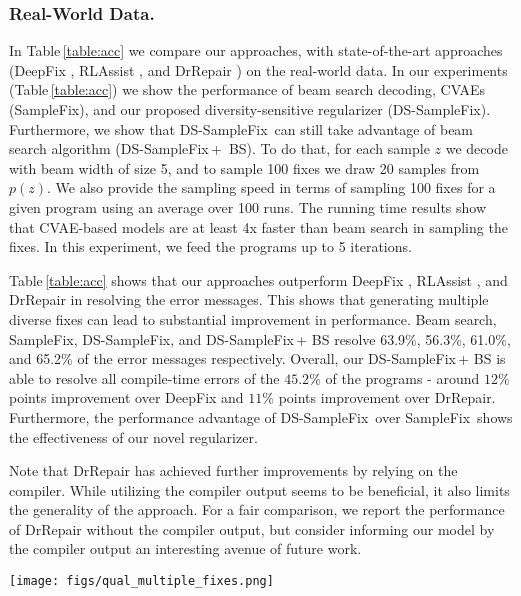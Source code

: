 \documentclass[runningheads]{llncs}
\newcommand{\samplefix}{SampleFix}
\newcommand{\dssmaplefix}{DS-SampleFix}
\newcommand{\tableref}{Table}
\begin{document}
\subsubsection{Real-World Data.}  In \tableref \,\ref{table:acc} we compare our approaches, with state-of-the-art approaches (DeepFix \cite{Gupta2017DeepFixFC}, RLAssist \cite{gupta2019RLAssist}, and DrRepair \cite{yasunaga2020repair}) on the real-world data. In our experiments (\tableref \,\ref{table:acc}) we show the performance of beam search decoding, CVAEs (\samplefix), and our proposed diversity-sensitive regularizer (\dssmaplefix). Furthermore, we show that \dssmaplefix\, can still take advantage of beam search algorithm (\dssmaplefix\,+~BS). To do that, for each sample $z$ we decode with beam width of size 5, and to sample 100 fixes we draw 20 samples from $p(z)$. We also provide the sampling speed in terms of sampling 100 fixes for a given program using an average over 100 runs. The running time results show that CVAE-based models are at least 4x faster than beam search in sampling the fixes. In this experiment, we feed the programs up to 5 iterations.

\tableref \,\ref{table:acc} shows that our approaches outperform DeepFix \cite{Gupta2017DeepFixFC}, RLAssist \cite{gupta2019RLAssist}, and DrRepair \cite{yasunaga2020repair} in resolving the error messages. This shows that generating multiple diverse fixes can lead to substantial improvement in performance. Beam search, \samplefix, \dssmaplefix, and \dssmaplefix \,+ BS resolve 63.9\%, 56.3\%, 61.0\%, and 65.2\% of the error messages respectively.
Overall, our \dssmaplefix \,+ BS is able to resolve all compile-time errors of the $45.2\%$ of the programs - around $12\%$ points improvement over DeepFix and $11\%$ points improvement over DrRepair. Furthermore, the performance advantage of \dssmaplefix \, over \samplefix \, shows the effectiveness of our novel regularizer. 


Note that DrRepair \cite{yasunaga2020repair} has achieved further improvements by relying on the compiler. While utilizing the compiler output seems to be beneficial, it also limits the generality of the approach.
For a fair comparison, we report the performance of DrRepair without the compiler output, but consider informing our model by the compiler output an interesting avenue of future work.




\begin{figure*}[h] 
	\centering
	    \centering
		\texttt{[image: figs/qual\_multiple\_fixes.png]}
	
	\caption{An example illustrating that our DS-SampleFix can generate diverse fixes. Left: Example of a program with a typographic error. The error, i.e., missing bracket, is highlighted at line 13. Right: Our DS-SampleFix proposes multiple fixes for the given error (line number with the corresponding fix), highlighting the ability of DS-SampleFix to generate diverse and accurate fixes.}
	\label{fig:example1}
\end{figure*}
\end{document}

